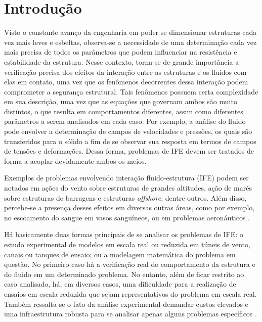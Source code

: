 \chapter{Introdução}


Visto o constante avanço da engenharia em poder se dimensionar estruturas cada vez mais leves e esbeltas, observa-se a necessidade de uma determinação cada vez mais precisa de todos os parâmetros que podem influenciar na resistência e estabilidade da estrutura. Nesse contexto, torna-se de grande importância a verificação precisa dos efeitos da interação entre as estruturas e os fluidos com elas em contato, uma vez que os fenômenos decorrentes dessa interação podem comprometer a segurança estrutural. Tais fenômenos possuem certa complexidade em sua descrição, uma vez que as equações que governam ambos são muito distintos, o que resulta em comportamentos diferentes, assim como diferentes parâmetros a serem analisados em cada caso. Por exemplo, a análise do fluido pode envolver a determinação de campos de velocidades e pressões, os quais são transferidos para o sólido a fim de se observar sua resposta em termos de campos de tensões e deformações. Dessa forma, problemas de IFE devem ser tratados de forma a acoplar devidamente ambos os meios.

Exemplos de problemas envolvendo interação fluido-estrutura (IFE) podem ser notados em ações do vento sobre estruturas de grandes altitudes, ação de marés sobre estruturas de barragens e estruturas \textit{offshore}, dentre outros. Além disso, percebe-se a presença desses efeitos em diversas outras áreas, como por exemplo, no escoamento do sangue em vasos sanguíneos, ou em problemas aeronáuticos \cite{sanches2014fluid, fernandes2020tecnica}.

Há basicamente duas formas principais de se analisar os problemas de IFE: o estudo experimental de modelos em escala real ou reduzida em túneis de vento, canais ou tanques de ensaio; ou a modelagem matemática do problema em questão. No primeiro caso há a verificação real do comportamento da estrutura e do fluido em um determinado problema. No entanto, além de ficar restrito ao caso analisado, há, em diversos casos, uma dificuldade para a realização de ensaios em escala reduzida que sejam representativos do problema em escala real. Também ressalta-se o fato da análise experimental demandar custos elevados e uma infraestrutura robusta para se analisar apenas alguns problemas específicos \cite{fernandes2020tecnica}.

